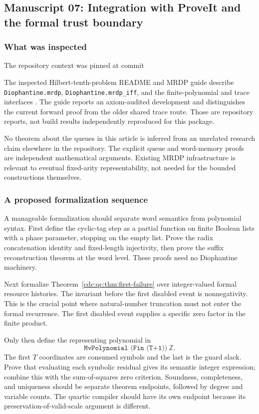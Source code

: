 \documentclass[11pt,a4paper]{article}
\theoremstyle{definition}
\theoremstyle{remark}
\newcommand{\Z}{\mathbb Z}
\begin{document}
\clearpage

\subsection{Manuscript 07: Integration with ProveIt and the formal trust boundary}
\subsubsection{What was inspected}
The repository context was pinned at commit
\begin{center}\small{}\end{center}
The inspected Hilbert-tenth-problem README and MRDP guide describe \texttt{Diophantine.mrdp}, \texttt{Diophantine.mrdp\_iff}, and the finite-polynomial and trace interfaces \cite{repo-mrdp,repo-h10}. The guide reports an axiom-audited development and distinguishes the current forward proof from the older shared trace route. Those are repository reports, not build results independently reproduced for this package.

No theorem about the queues in this article is inferred from an unrelated research claim elsewhere in the repository. The explicit queue and word-memory proofs are independent mathematical arguments. Existing MRDP infrastructure is relevant to eventual fixed-arity representability, not needed for the bounded constructions themselves.

\subsubsection{A proposed formalization sequence}
A manageable formalization should separate word semantics from polynomial syntax. First define the cyclic-tag step as a partial function on finite Boolean lists with a phase parameter, stopping on the empty list. Prove the radix concatenation identity and fixed-length injectivity, then prove the suffix reconstruction theorem at the word level. These proofs need no Diophantine machinery.

Next formalize Theorem~\ref{cdc:qc:thm:first-failure} over integer-valued formal resource histories. The invariant before the first disabled event is nonnegativity. This is the crucial point where natural-number truncation must not enter the formal recurrence. The first disabled event supplies a specific zero factor in the finite product.

Only then define the representing polynomial in
\[
 \texttt{MvPolynomial (Fin (T+1))}\ \Z.
\]
The first $T$ coordinates are consumed symbols and the last is the guard slack. Prove that evaluating each symbolic residual gives its semantic integer expression; combine this with the sum-of-squares zero criterion. Soundness, completeness, and uniqueness should be separate theorem endpoints, followed by degree and variable counts. The quartic compiler should have its own endpoint because its preservation-of-valid-scale argument is different.
\end{document}
